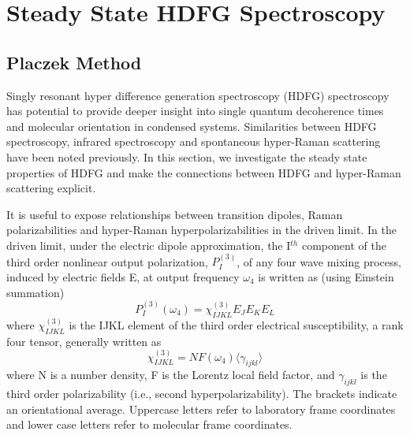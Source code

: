 \documentclass[aip, jcp, reprint, onecolumn]{revtex4-2}
\begin{document}
\section{Steady State HDFG Spectroscopy}\label{steadystate}
\subsection{Placzek Method}
Singly resonant hyper difference generation spectroscopy (HDFG) spectroscopy has potential to provide deeper insight into single quantum decoherence times and molecular orientation in condensed systems.
Similarities between HDFG spectroscopy, infrared spectroscopy and spontaneous hyper-Raman scattering have been noted previously. \cite{RN352, Bonn2024, McDonnell2024}
In this section, we investigate the steady state properties of HDFG and make the connections between HDFG and hyper-Raman scattering explicit.

It is useful to expose relationships between transition dipoles, Raman polarizabilities and hyper-Raman hyperpolarizabilities in the driven limit. \cite{Druet1978, Simpson2004}
In the driven limit, under the electric dipole approximation, the I$^{th}$ component of the third order nonlinear output polarization, ${P}^{(3)}_I$, of any four wave mixing process, induced by electric fields E, at output frequency $\omega_4$ is written as (using Einstein summation) \cite{RN307}
\begin{equation} \label{polarization}
{P}^{(3)}_I (\omega_4)  = \chi^{(3)}_{IJKL} E_J E_K E_L 
\end{equation}
where $\chi^{(3)}_{IJKL}$ is the IJKL element of the third order electrical susceptibility, a rank four tensor, generally written as
\begin{equation}
	\chi^{(3)}_{IJKL} = NF(\omega_4) \langle \gamma_{ijkl} \rangle
\end{equation}
where N is a number density, F is the Lorentz local field factor, and $\gamma_{ijkl}$ is the third order polarizability (i.e., second hyperpolarizability). 
The brackets indicate an orientational average. 
Uppercase letters refer to laboratory frame coordinates and lower case letters refer to molecular frame coordinates.
\end{document}
